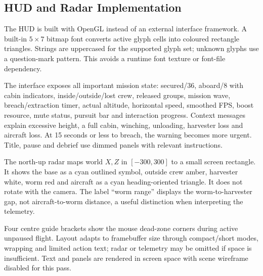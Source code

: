 \subsection{HUD and Radar Implementation}
The HUD is built with OpenGL instead of an external interface framework. A built-in $5\times7$ bitmap font converts active glyph cells into coloured rectangle triangles. Strings are uppercased for the supported glyph set; unknown glyphs use a question-mark pattern. This avoids a runtime font texture or font-file dependency.

The interface exposes all important mission state: secured/36, aboard/8 with cabin indicators, inside/outside/lost crew, released groups, mission wave, breach/extraction timer, actual altitude, horizontal speed, smoothed FPS, boost resource, mute status, pursuit bar and interaction progress. Context messages explain excessive height, a full cabin, winching, unloading, harvester loss and aircraft loss. At 15 seconds or less to breach, the warning becomes more urgent. Title, pause and debrief use dimmed panels with relevant instructions.

The north-up radar maps world $X,Z$ in $[-300,300]$ to a small screen rectangle. It shows the base as a cyan outlined symbol, outside crew amber, harvester white, worm red and aircraft as a cyan heading-oriented triangle. It does not rotate with the camera. The label ``worm range'' displays the worm-to-harvester gap, not aircraft-to-worm distance, a useful distinction when interpreting the telemetry.

Four centre guide brackets show the mouse dead-zone corners during active unpaused flight. Layout adapts to framebuffer size through compact/short modes, wrapping and limited action text; radar or telemetry may be omitted if space is insufficient. Text and panels are rendered in screen space with scene wireframe disabled for this pass.

